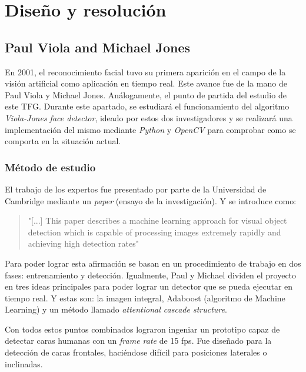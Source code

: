 
\chapter{Diseño y resolución}


\section{Paul Viola and Michael Jones} \label{haar-like}

En 2001, el reconocimiento facial tuvo su primera aparición en el campo de la visión artificial como aplicación en tiempo real. Este avance fue de la mano de Paul Viola y Michael Jones. Análogamente, el punto de partida del estudio de este TFG. Durante este apartado, se estudiará el funcionamiento del algoritmo \textit{Viola-Jones face detector}, ideado por estos dos investigadores y se realizará una implementación del mismo mediante \textit{Python} y \textit{OpenCV} para comprobar como se comporta en la situación actual.

\subsection*{Método de estudio}

El trabajo de los expertos fue presentado por parte de la Universidad de Cambridge mediante un \textit{paper} (ensayo de la investigación). Y se introduce como: 
\begin{quote}
	"[...] This paper describes a machine learning approach for visual object detection which is capable of processing images extremely rapidly and achieving high detection rates" \cite{paulViola}
\end{quote}

Para poder lograr esta afirmación se basan en un procedimiento de trabajo en dos fases: entrenamiento y detección. Igualmente, Paul y Michael dividen el proyecto en tres ideas principales para poder lograr un detector que se pueda ejecutar en tiempo real. Y estas son: la imagen integral, Adaboost (algoritmo de Machine Learning) y un método llamado \textit{attentional cascade structure}. 

Con todos estos puntos combinados lograron ingeniar un prototipo capaz de detectar caras humanas con un \textit{frame rate} de 15 fps. Fue diseñado para la detección de caras frontales, haciéndose difícil para posiciones laterales o inclinadas.

